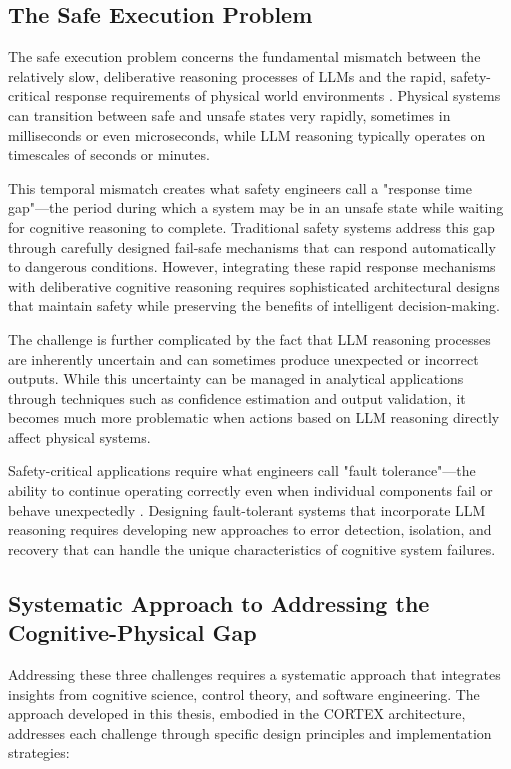\subsection{The Safe Execution Problem}

The safe execution problem concerns the fundamental mismatch between the relatively slow, deliberative reasoning processes of LLMs and the rapid, safety-critical response requirements of physical world environments \cite{leveson2011engineering, knight2002safety}. Physical systems can transition between safe and unsafe states very rapidly, sometimes in milliseconds or even microseconds, while LLM reasoning typically operates on timescales of seconds or minutes.

This temporal mismatch creates what safety engineers call a "response time gap"—the period during which a system may be in an unsafe state while waiting for cognitive reasoning to complete. Traditional safety systems address this gap through carefully designed fail-safe mechanisms that can respond automatically to dangerous conditions. However, integrating these rapid response mechanisms with deliberative cognitive reasoning requires sophisticated architectural designs that maintain safety while preserving the benefits of intelligent decision-making.

The challenge is further complicated by the fact that LLM reasoning processes are inherently uncertain and can sometimes produce unexpected or incorrect outputs. While this uncertainty can be managed in analytical applications through techniques such as confidence estimation and output validation, it becomes much more problematic when actions based on LLM reasoning directly affect physical systems.

Safety-critical applications require what engineers call "fault tolerance"—the ability to continue operating correctly even when individual components fail or behave unexpectedly \cite{avizienis2004basic, powell1992delta}. Designing fault-tolerant systems that incorporate LLM reasoning requires developing new approaches to error detection, isolation, and recovery that can handle the unique characteristics of cognitive system failures.

\subsection{Systematic Approach to Addressing the Cognitive-Physical Gap}

Addressing these three challenges requires a systematic approach that integrates insights from cognitive science, control theory, and software engineering. The approach developed in this thesis, embodied in the CORTEX architecture, addresses each challenge through specific design principles and implementation strategies:

